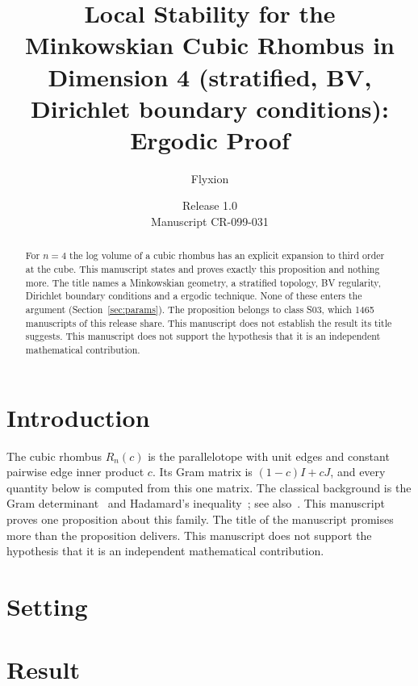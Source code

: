 \documentclass[11pt]{article}
\title{Local Stability for the Minkowskian Cubic Rhombus in Dimension 4 (stratified, BV, Dirichlet boundary conditions): Ergodic Proof}
\author{Flyxion}
\date{Release 1.0\\ Manuscript CR-099-031}
\begin{document}
\maketitle
\begin{abstract}
For $n=4$ the log volume of a cubic rhombus has an explicit expansion to third order at the cube. This manuscript states and proves exactly this proposition and nothing more. The title names a Minkowskian geometry, a stratified topology, BV regularity, Dirichlet boundary conditions and a ergodic technique. None of these enters the argument (Section~\ref{sec:params}). The proposition belongs to class S03, which 1465 manuscripts of this release share. This manuscript does not establish the result its title suggests. This manuscript does not support the hypothesis that it is an independent mathematical contribution.
\end{abstract}

\section{Introduction}
The cubic rhombus $R_n(c)$ is the parallelotope with unit edges and constant pairwise edge inner product $c$. Its Gram matrix is $(1-c)I+cJ$, and every quantity below is computed from this one matrix. The classical background is the Gram determinant~\cite{gram} and Hadamard's inequality~\cite{hadamard}; see also~\cite{hj}.
This manuscript proves one proposition about this family. The title of the manuscript promises more than the proposition delivers. This manuscript does not support the hypothesis that it is an independent mathematical contribution.

\section{Setting}


\section{Result}

\end{document}
